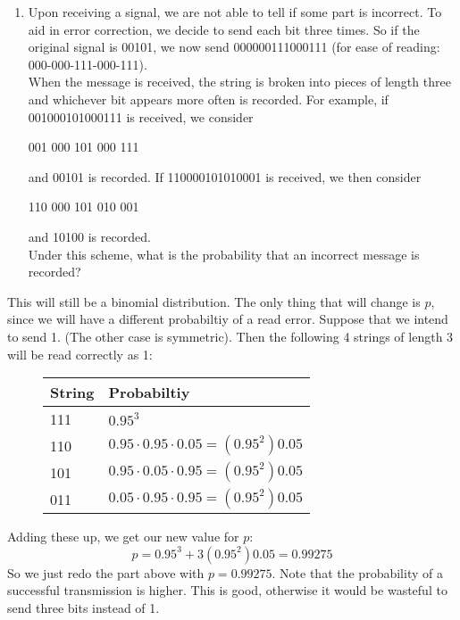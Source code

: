 \documentclass[12pt]{article}
\begin{document}
\begin{enumerate}
\begin{enumerate}
\item Upon receiving a signal, we are not able to tell if some part is incorrect. To aid in error correction, we decide to send each bit three times. So if the original signal is 00101, we now send 000000111000111 (for ease of reading: 000-000-111-000-111).\\
\linebreak
When the message is received, the string is broken into pieces of length three and whichever bit appears more often is recorded. For example, if 001000101000111 is received, we consider\\
\begin{center}
001 000 101 000 111\\
\end{center}
and 00101 is recorded. If 110000101010001 is received, we then consider
\begin{center}
110 000 101 010 001\\
\end{center}
and 10100 is recorded.\\
\linebreak
Under this scheme, what is the probability that an incorrect message is recorded?
\end{enumerate}

This will still be a binomial distribution. The only thing that will change is $p$, since we will have a different probabiltiy of a read error. Suppose that we intend to send 1. (The other case is symmetric). Then the following 4 strings of length 3 will be read correctly as 1:
\begin{figure}[H]
\centering
\begin{tabular}{l@{\hskip 2cm}l}
\toprule
String & Probabiltiy\\
\midrule
111 & $0.95^3$ \\
110 & $0.95 \cdot 0.95 \cdot 0.05 = (0.95^2) 0.05 $\\
101 & $0.95 \cdot 0.05 \cdot 0.95 = (0.95^2) 0.05 $ \\
011 & $0.05 \cdot 0.95 \cdot 0.95 = (0.95^2) 0.05 $\\ 
\bottomrule
\end{tabular}
\end{figure}
Adding these up, we get our new value for $p$:
\[
p = 0.95^3 + 3 (0.95^2) 0.05 = 0.99275
\]
So we just redo the part above with $p = 0.99275$. Note that the probability of a successful transmission is higher. This is good, otherwise it would be wasteful to send three bits instead of 1.


\end{enumerate}
\end{document}
